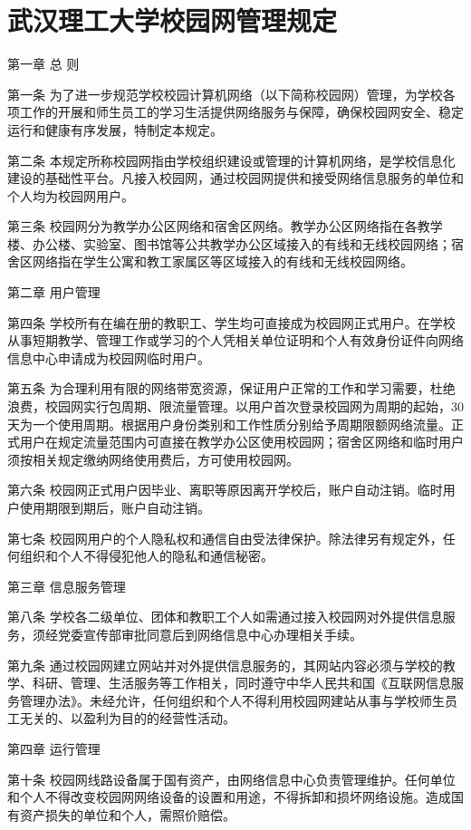 \documentclass[UTF8,12pt,a4paper]{report}
\begin{document}
\chapter{武汉理工大学校园网管理规定}
第一章 总 则

第一条 为了进一步规范学校校园计算机网络（以下简称校园网）管理，为学校各项工作的开展和师生员工的学习生活提供网络服务与保障，确保校园网安全、稳定运行和健康有序发展，特制定本规定。

第二条 本规定所称校园网指由学校组织建设或管理的计算机网络，是学校信息化建设的基础性平台。凡接入校园网，通过校园网提供和接受网络信息服务的单位和个人均为校园网用户。

第三条 校园网分为教学办公区网络和宿舍区网络。教学办公区网络指在各教学楼、办公楼、实验室、图书馆等公共教学办公区域接入的有线和无线校园网络；宿舍区网络指在学生公寓和教工家属区等区域接入的有线和无线校园网络。

第二章 用户管理

第四条 学校所有在编在册的教职工、学生均可直接成为校园网正式用户。在学校从事短期教学、管理工作或学习的个人凭相关单位证明和个人有效身份证件向网络信息中心申请成为校园网临时用户。

第五条 为合理利用有限的网络带宽资源，保证用户正常的工作和学习需要，杜绝浪费，校园网实行包周期、限流量管理。以用户首次登录校园网为周期的起始，30天为一个使用周期。根据用户身份类别和工作性质分别给予周期限额网络流量。正式用户在规定流量范围内可直接在教学办公区使用校园网；宿舍区网络和临时用户须按相关规定缴纳网络使用费后，方可使用校园网。

第六条 校园网正式用户因毕业、离职等原因离开学校后，账户自动注销。临时用户使用期限到期后，账户自动注销。

第七条 校园网用户的个人隐私权和通信自由受法律保护。除法律另有规定外，任何组织和个人不得侵犯他人的隐私和通信秘密。

第三章 信息服务管理

第八条 学校各二级单位、团体和教职工个人如需通过接入校园网对外提供信息服务，须经党委宣传部审批同意后到网络信息中心办理相关手续。

第九条 通过校园网建立网站并对外提供信息服务的，其网站内容必须与学校的教学、科研、管理、生活服务等工作相关，同时遵守中华人民共和国《互联网信息服务管理办法》。未经允许，任何组织和个人不得利用校园网建站从事与学校师生员工无关的、以盈利为目的的经营性活动。

第四章 运行管理

第十条 校园网线路设备属于国有资产，由网络信息中心负责管理维护。任何单位和个人不得改变校园网网络设备的设置和用途，不得拆卸和损坏网络设施。造成国有资产损失的单位和个人，需照价赔偿。
\end{document}
